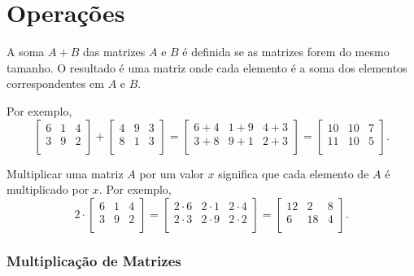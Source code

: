 \section{Operações}

A soma $A+B$ das matrizes $A$ e $B$
é definida se as matrizes forem do mesmo tamanho.
O resultado é uma matriz onde cada elemento
é a soma dos elementos correspondentes
em $A$ e $B$.

Por exemplo,
\[
 \begin{bmatrix}
  6 & 1 & 4 \\
  3 & 9 & 2 \\
 \end{bmatrix}
+
 \begin{bmatrix}
  4 & 9 & 3 \\
  8 & 1 & 3 \\
 \end{bmatrix}
=
 \begin{bmatrix}
  6+4 & 1+9 & 4+3 \\
  3+8 & 9+1 & 2+3 \\
 \end{bmatrix}
=
 \begin{bmatrix}
  10 & 10 & 7 \\
  11 & 10 & 5 \\
 \end{bmatrix}.
\]

Multiplicar uma matriz $A$ por um valor $x$ significa
que cada elemento de $A$ é multiplicado por $x$.
Por exemplo,
\[
 2 \cdot \begin{bmatrix}
  6 & 1 & 4 \\
  3 & 9 & 2 \\
 \end{bmatrix}
=
 \begin{bmatrix}
  2 \cdot 6 & 2\cdot1 & 2\cdot4 \\
  2\cdot3 & 2\cdot9 & 2\cdot2 \\
 \end{bmatrix}
=
 \begin{bmatrix}
  12 & 2 & 8 \\
  6 & 18 & 4 \\
 \end{bmatrix}.
\]

\subsubsection{Multiplicação de Matrizes}


